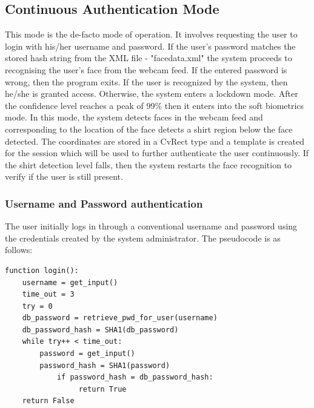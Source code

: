 \documentclass[12pt]{article}			%
\begin{document}
\subsection { Continuous Authentication Mode }
This mode is the de-facto mode of operation. It involves requesting the user to login with his/her username and password. If the user's password matches the stored hash string from the XML file - "facedata.xml" the system proceeds to recognising the user's face from the webcam feed. If the entered password is wrong, then the program exits. If the user is recognized by the system, then he/she is granted access. Otherwise, the system enters a lockdown mode. After the confidence level reaches a peak of 99\% then it enters into the soft biometrics mode. In this mode, the system detects faces in the webcam feed and corresponding to the location of the face detects a shirt region below the face detected. The coordinates are stored in a CvRect type and a template is created for the session which will be used to further authenticate the user continuously. If the shirt detection level falls, then the system restarts the face recognition to verify if the user is still present.

\subsubsection{ Username and Password authentication }
The user initially logs in through a conventional username and password using the credentials created by the system administrator. The pseudocode is as follows:

\begin{verbatim}
function login():
    username = get_input()
    time_out = 3
    try = 0
    db_password = retrieve_pwd_for_user(username)
    db_password_hash = SHA1(db_password)
    while try++ < time_out:
        password = get_input()
        password_hash = SHA1(password)
            if password_hash = db_password_hash:
                 return True
    return False
\end{verbatim}
\end{document}

